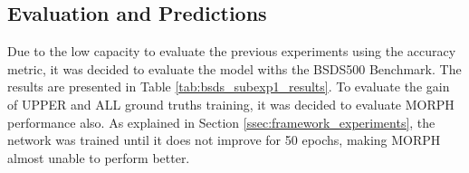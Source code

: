 \begin{comment}
Once the objective functions are different, it's not possible to compare metrics values returned by training statistics in each phase. 
For this, it was evaluated the results of border detection using BSDS500 Benchmark.
The results will be shown in Section \ref{ssec:basic_pred_eval}, when they will be compared to the results obtained by the ALO-AVG and ALO-MAX networks, that will be described in the following sections.
\end{comment}

\subsection{Evaluation and Predictions}
\label{ssec:basic_pred_eval}

Due to the low capacity to evaluate the previous experiments using the accuracy metric, it was decided to evaluate the model withs the BSDS500 Benchmark.
The results are presented in Table \ref{tab:bsds_subexp1_results}.
To evaluate the gain of UPPER and ALL ground truths training, it was decided to evaluate MORPH performance also.
As explained in Section \ref{ssec:framework_experiments}, the network was trained until it does not improve for 50 epochs, making MORPH almost unable to perform better.

